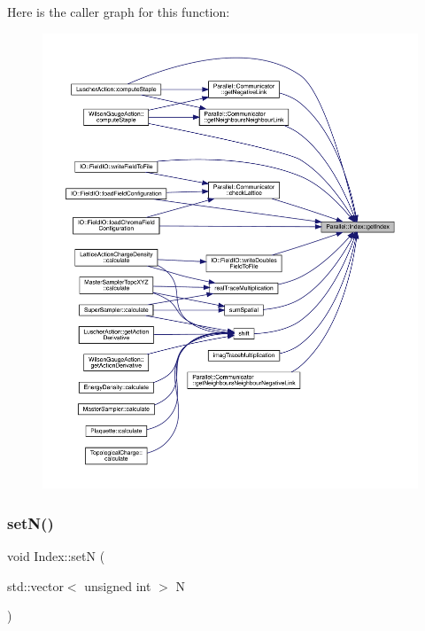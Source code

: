 Here is the caller graph for this function\+:
\nopagebreak
\begin{figure}[H]
\begin{center}
\leavevmode
\includegraphics[width=350pt]{class_parallel_1_1_index_af31faeef1369fdc0997d1910e008bfe2_icgraph}
\end{center}
\end{figure}
\mbox{\label{class_parallel_1_1_index_acbf43868aa2efc7ecf63b5b490fc00a0}} 
\subsubsection{\texorpdfstring{setN()}{setN()}}
{\footnotesize\ttfamily void Index\+::setN (\begin{DoxyParamCaption}\item[{std\+::vector$<$ unsigned int $>$}]{N }\end{DoxyParamCaption})\hspace{0.3cm}{\ttfamily [static]}}



